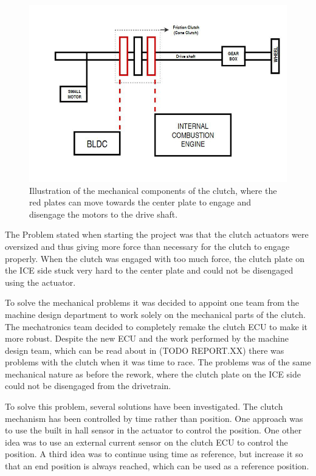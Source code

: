 \begin{figure}[H]
    \centering
    \label{fig:Drivetrain}
    \includegraphics[width=1\textwidth]{./img/Drivetrain}
    \caption{Illustration of the mechanical components of the clutch, where the red plates can move towards the center plate to engage and disengage the motors to the drive shaft.}
\end{figure}

The Problem stated when starting the project was that the clutch actuators were oversized and thus giving more force than necessary for the clutch to engage properly. When the clutch was engaged with too much force, the clutch plate on the ICE side stuck very hard to the center plate and could not be disengaged using the actuator.

To solve the mechanical problems it was decided to appoint one team from the machine design department to work solely on the mechanical parts of the clutch. The mechatronics team decided to completely remake the clutch ECU to make it more robust. Despite the new ECU and the work performed by the machine design team, which can be read about in (TODO REPORT.XX) there was problems with the clutch when it was time to race. The problems was of the same mechanical nature as before the rework, where the clutch plate on the ICE side could not be disengaged from the drivetrain.

To solve this problem, several solutions have been investigated. The clutch mechanism has been controlled by time rather than position. One approach was to use the built in hall sensor in the actuator to control the position. One other idea was to use an external current sensor on the clutch ECU to control the position. A third idea was to continue using time as reference, but increase it so that an end position is always reached, which can be used as a reference position.

